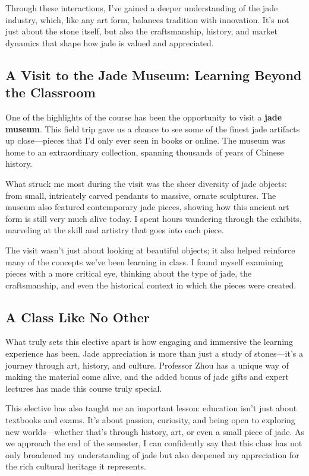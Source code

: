 \documentclass[a4paper]{article} 	%
\begin{document}
Through these interactions, I’ve gained a deeper understanding of the jade industry, which, like any art form, balances tradition with innovation. It’s not just about the stone itself, but also the craftsmanship, history, and market dynamics that shape how jade is valued and appreciated.

\subsection*{A Visit to the Jade Museum: Learning Beyond the Classroom}

One of the highlights of the course has been the opportunity to visit a \textbf{jade museum}. This field trip gave us a chance to see some of the finest jade artifacts up close—pieces that I’d only ever seen in books or online. The museum was home to an extraordinary collection, spanning thousands of years of Chinese history.

What struck me most during the visit was the sheer diversity of jade objects: from small, intricately carved pendants to massive, ornate sculptures. The museum also featured contemporary jade pieces, showing how this ancient art form is still very much alive today. I spent hours wandering through the exhibits, marveling at the skill and artistry that goes into each piece.

The visit wasn’t just about looking at beautiful objects; it also helped reinforce many of the concepts we’ve been learning in class. I found myself examining pieces with a more critical eye, thinking about the type of jade, the craftsmanship, and even the historical context in which the pieces were created.

\subsection*{A Class Like No Other}

What truly sets this elective apart is how engaging and immersive the learning experience has been. Jade appreciation is more than just a study of stones—it’s a journey through art, history, and culture. Professor Zhou has a unique way of making the material come alive, and the added bonus of jade gifts and expert lectures has made this course truly special.

This elective has also taught me an important lesson: education isn’t just about textbooks and exams. It’s about passion, curiosity, and being open to exploring new worlds—whether that’s through history, art, or even a small piece of jade. As we approach the end of the semester, I can confidently say that this class has not only broadened my understanding of jade but also deepened my appreciation for the rich cultural heritage it represents.
\end{document}
